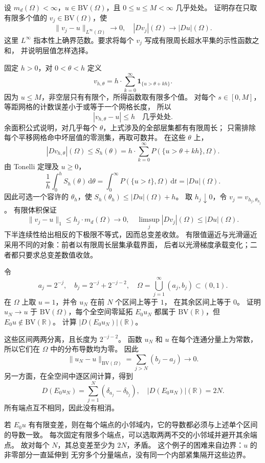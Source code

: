 \begin{optionalexercise}\label{b1:ex:27-finite-valued-strict-approximation}
设 \(m_d(\Omega)<\infty\)，\(u\in \mathrm{BV}(\Omega)\)，且 \(0\le u\le M<\infty\) 几乎处处。
证明存在只取有限多个值的 \(v_j\in \mathrm{BV}(\Omega)\)，使
\[
 \|v_j-u\|_{L^\infty(\Omega)}\longrightarrow0,\quad
 |Dv_j|(\Omega)\longrightarrow|Du|(\Omega).
\]
这里 \(L^\infty\) 指本性上确界范数。要求将每个 \(v_j\) 写成有限周长超水平集的示性函数之和，
并说明层值怎样选择。
\end{optionalexercise}
\begin{solution}
固定 \(h>0\)，对 \(0<\theta<h\) 定义
\[
 v_{h,\theta}
   =h\cdot\sum_{k=0}^\infty\mathbf1_{\{u>\theta+kh\}}.
\]
因为 \(u\le M\)，非空层只有有限个，所得函数取有限多个值。
对每个 \(s\in[0,M]\)，等距网格的计数误差小于或等于一个网格长度，
所以
\[
 |v_{h,\theta}-u|\le h\quad\text{几乎处处}.
\]
余面积公式说明，对几乎每个 \(\theta\)，上式涉及的全部层集都有有限周长；
只需排除每个平移网格命中坏层值的零测集，再取可数并。
在这些 \(\theta\) 上，
\[
 |Dv_{h,\theta}|(\Omega)
 \le S_h(\theta)=
        h\cdot\sum_{k=0}^\infty P(\{u>\theta+kh\},\Omega).
\]
由 Tonelli 定理及 \(u\ge0\)，
\[
 \frac1h\int_0^hS_h(\theta)\,\mathrm d\theta
 =\int_0^\infty P(\{u>t\},\Omega)\,\mathrm dt
 =|Du|(\Omega).
\]
因此可选一个容许的 \(\theta_h\)，使
\(S_h(\theta_h)\le|Du|(\Omega)+h\)。
取 \(h_j\downarrow0\)，令 \(v_j=v_{h_j,\theta_{h_j}}\)。
有限体积保证
\[
 \|v_j-u\|_1\le h_j\cdot m_d(\Omega)\longrightarrow0,
 \quad
 \limsup_j|Dv_j|(\Omega)\le|Du|(\Omega).
\]
下半连续性给出相反的下极限不等式，因而总变差收敛。
有限值逼近与光滑逼近采用不同的对象：前者以有限周长层集承载界面，
后者以光滑梯度承载变化；二者都只要求总变差数值收敛。
\end{solution}

\begin{exercise}\label{b1:ex:27-irregular-zero-extension}
令
\[
 a_j=2^{-j},\quad b_j=2^{-j}+2^{-j-2},\quad
 \Omega=\bigcup_{j=1}^\infty(a_j,b_j)\subset(0,1).
\]
在 \(\Omega\) 上取 \(u=1\)，并令 \(u_N\) 在前 \(N\) 个区间上等于 \(1\)，
在其余区间上等于 \(0\)。
证明 \(u_N\to u\) 于 \(\mathrm{BV}(\Omega)\)，每个全空间零延拓 \(E_0u_N\) 都属于
\(\mathrm{BV}(\mathbb R)\)，但 \(E_0u\notin \mathrm{BV}(\mathbb R)\)。
计算 \(|D(E_0u_N)|(\mathbb R)\)。
\end{exercise}
\begin{solution}
这些区间两两分离，且长度为 \(2^{-j-2}\)。
函数 \(u_N\) 和 \(u\) 在每个连通分量上为常数，所以它们在 \(\Omega\) 中的分布导数均为零。
因此
\[
 \|u_N-u\|_{\mathrm{BV}(\Omega)}
 =\sum_{j>N}(b_j-a_j)\longrightarrow0.
\]
另一方面，在全空间中逐区间计算，得到
\[
 D(E_0u_N)=\sum_{j=1}^N(\delta_{a_j}-\delta_{b_j}),
 \quad
 |D(E_0u_N)|(\mathbb R)=2N.
\]
所有端点互不相同，因此没有相消。

若 \(E_0u\) 有有限变差，则在每个端点的小邻域内，它的导数都必须与上述单个区间的导数一致。
每次固定有限多个端点，可以选取两两不交的小邻域并避开其余端点。
故对每个 \(N\)，其总变差至少为 \(2N\)，矛盾。
这个例子的困难来自边界：\(u\) 的非零部分一直延伸到
无穷多个分量端点，没有同一个内部紧集隔开这些边界。
\end{solution}

